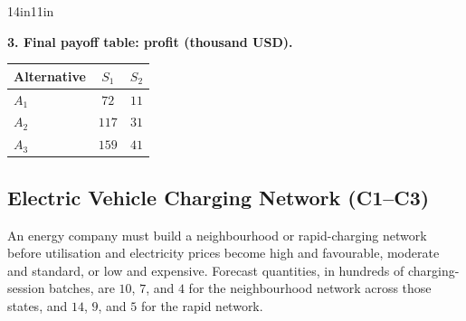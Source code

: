 \begin{CalculationLandscape}{14in}{11in}

\noindent\begin{minipage}{\linewidth}
\textbf{3. Final payoff table: profit (thousand USD).}
\begin{center}
\begin{tabular}{@{}lcc@{}}
\toprule
Alternative & \(S_1\) & \(S_2\) \\
\midrule
\(A_1\) & \(72\) & \(11\) \\
\(A_2\) & \(117\) & \(31\) \\
\(A_3\) & \(159\) & \(41\) \\
\bottomrule
\end{tabular}
\end{center}
\end{minipage}



\end{CalculationLandscape}


	\subsection{Electric Vehicle Charging Network (C1--C3)}
	\label{sec:problem21-electric-vehicle-charging-network-c1-c3}

	An energy company must build a neighbourhood or rapid-charging network before utilisation and electricity prices become high and favourable, moderate and standard, or low and expensive. Forecast quantities, in hundreds of charging-session batches, are \(10\), \(7\), and \(4\) for the neighbourhood network across those states, and \(14\), \(9\), and \(5\) for the rapid network.

